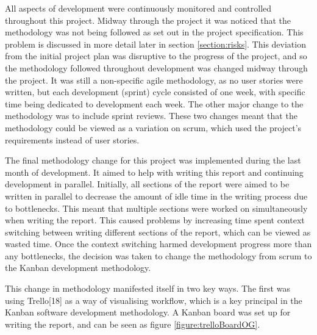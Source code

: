 \documentclass{article}
\begin{document}
All aspects of development were continuously monitored and controlled throughout this project. Midway through the project it was noticed that the methodology was not being followed as set out in the project specification. This problem is discussed in more detail later in section \ref{section:risks}. This deviation from the initial project plan was disruptive to the progress of the project, and so the methodology followed throughout development was changed midway through the project. It was still a non-specific agile methodology, as no user stories were written, but each development (sprint) cycle consisted of one week, with specific time being dedicated to development each week. The other major change to the methodology was to include sprint reviews. These two changes meant that the methodology could be viewed as a variation on scrum, which used the project's requirements instead of user stories. \par

The final methodology change for this project was implemented during the last month of development. It aimed to help with writing this report and continuing development in parallel. Initially, all sections of the report were aimed to be written in parallel to decrease the amount of idle time in the writing process due to bottlenecks. This meant that multiple sections were worked on simultaneously when writing the report. This caused problems by increasing time spent context switching between writing different sections of the report, which can be viewed as wasted time. Once the context switching harmed development progress more than any bottlenecks, the decision was taken to change the methodology from scrum to the Kanban development methodology. \par

This change in methodology manifested itself in two key ways. The first was using Trello[18] as a way of visualising workflow, which is a key principal in the Kanban software development methodology. A Kanban board was set up for writing the report, and can be seen as figure \ref{figure:trelloBoardOG}. \par
\end{document}
